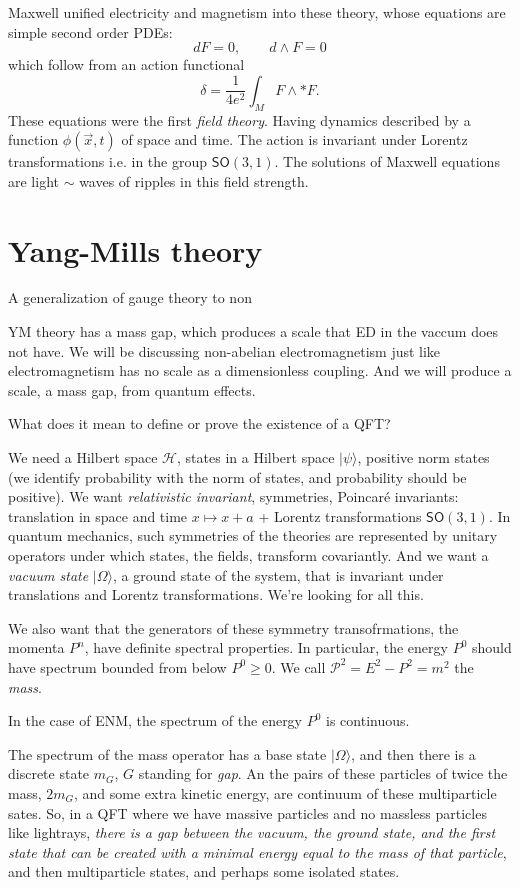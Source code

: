 Maxwell unified electricity and magnetism into these theory, whose equations are
simple second order PDEs:
\[dF=0,\qquad d\wedge F=0\]
which follow from an action functional
\[\delta=\frac{1}{4e^2}\int_{M}F\wedge * F.\]
These equations were the first \textit{field theory}. Having dynamics described
by a function $\phi(\vec{x},t)$ of space and time. The action is invariant under
Lorentz transformations i.e. in the group $\mathsf{SO}(3,1)$. The solutions of
Maxwell equations are light $\sim$ waves of ripples in this field strength.

\section{Yang-Mills theory}
\label{section-Yang-Mills-theory}

A generalization of gauge theory to non 

YM theory has a mass gap, which produces a scale that ED in the vaccum does not
have. We will be discussing non-abelian electromagnetism just like
electromagnetism has no scale as a dimensionless coupling. And we will produce a
scale, a mass gap, from quantum effects.

What does it mean to define or prove the existence of a QFT?

We need a Hilbert space $\mathcal{H}$, states in a Hilbert space $|\psi\rangle$,
positive norm states (we identify probability with the norm of states, and
probability should be positive). We want {\it relativistic invariant},
symmetries, Poincaré invariants: translation in space and time $x \mapsto x+a$ +
Lorentz transformations $\mathsf{SO}(3,1)$. In quantum mechanics, such
symmetries of the theories are represented by unitary operators under which
states, the fields, transform covariantly. And we want a {\it vacuum
state} $|\Omega\rangle$, a ground state of the system, that is invariant under
translations and Lorentz transformations. We're looking for all this.

We also want that the generators of these symmetry transofrmations, the momenta
$P^n$, have definite spectral properties. In particular, the energy $P^0$ should
have spectrum bounded from below $P^0\geq 0$. We call
$\mathcal{P}^2=E^2-P^2=m^2$ the {\it mass}.

In the case of ENM, the spectrum of the energy  $P^0$ is continuous.

The spectrum of the mass operator has a base state $|\Omega\rangle$, and then
there is a discrete state $m_G$, $G$ standing for \textit{gap}. An the pairs of
these particles of twice the mass, $2m_G$, and some extra kinetic energy, are
continuum of these multiparticle sates. So, in a QFT where we have massive
particles and no massless particles like lightrays, \textit{there is a gap
between the vacuum, the ground state, and the first state that can be created
with a minimal energy equal to the mass of that particle}, and then
multiparticle states, and perhaps some isolated states.

